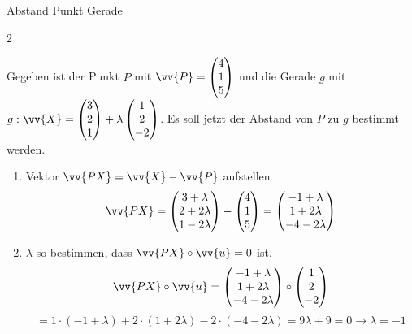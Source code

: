 \begin{bsp}{Abstand Punkt Gerade}{}
\begin{multicols}{2}
\begin{center}
\begin{tikzpicture}[scale=0.9, line cap=round, line join=round]
\end{tikzpicture}
\end{center}
        Gegeben ist der Punkt \(P\) mit \(\vv{P} = \begin{pmatrix}
            4\\1\\5
        \end{pmatrix}\) und die Gerade \(g\) mit \(g:\vv{X} = \begin{pmatrix}
            3\\2\\1
        \end{pmatrix} + \lambda \begin{pmatrix}
            1\\2\\-2
        \end{pmatrix}\). Es soll jetzt der Abstand von \(P\) zu \(g\) bestimmt werden.   
    \end{multicols}
    \begin{enumerate}
        \item Vektor \(\vv{PX} = \vv{X} -\vv{P}\)
        aufstellen \[\vv{PX} = \begin{pmatrix}
            3+\lambda\\ 2+2\lambda\\1-2\lambda
        \end{pmatrix} - \begin{pmatrix}
            4\\1\\5
        \end{pmatrix} = \begin{pmatrix}
            -1+\lambda\\1+2\lambda\\-4-2\lambda
        \end{pmatrix}\]
        \item \(\lambda\) so bestimmen, dass \(\vv{PX} \circ \vv{u} =0\) ist. \[\vv{PX}\circ\vv{u} = \begin{pmatrix}
            -1+\lambda\\1+2\lambda\\-4-2\lambda
        \end{pmatrix} \circ \begin{pmatrix}
            1\\2\\-2
        \end{pmatrix} \]\[ = 1\cdot(-1+\lambda )+2\cdot(1+2\lambda) -2\cdot (-4-2\lambda) = 9\lambda +9 = 0 \longrightarrow \lambda = -1\]

\end{enumerate}
\end{bsp}
